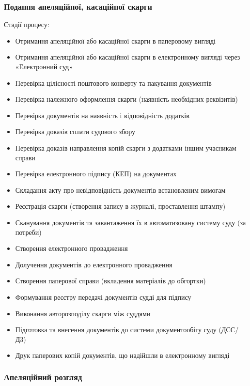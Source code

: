 \documentclass{article}
\begin{document}
\newpage
\subsubsection{Подання апеляційної, касаційної скарги}

Стадії процесу:

\begin{itemize}
    \item Отримання апеляційної або касаційної скарги в паперовому вигляді
    \item Отримання апеляційної або касаційної скарги в електронному вигляді через «Електронний суд»
    \item Перевірка цілісності поштового конверту та пакування документів
    \item Перевірка належного оформлення скарги (наявність необхідних реквізитів)
    \item Перевірка документів на наявність і відповідність додатків
    \item Перевірка доказів сплати судового збору
    \item Перевірка доказів направлення копій скарги з додатками іншим учасникам справи
    \item Перевірка електронного підпису (КЕП) на документах
    \item Складання акту про невідповідність документів встановленим вимогам
    \item Реєстрація скарги (створення запису в журналі, проставлення штампу)
    \item Сканування документів та завантаження їх в автоматизовану систему суду (за потреби)
    \item Створення електронного провадження
    \item Долучення документів до електронного провадження
    \item Створення паперової справи (вкладення матеріалів до обгортки)
    \item Формування реєстру передачі документів судді для підпису
    \item Виконання авторозподілу скарги між суддями
    \item Підготовка та внесення документів до системи документообігу суду (ДСС/Д3)
    \item Друк паперових копій документів, що надійшли в електронному вигляді
\end{itemize}

\newpage
\subsubsection{Апеляційний розгляд}
\end{document}
